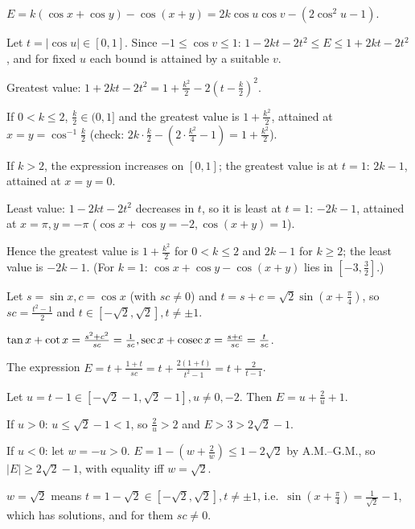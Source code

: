   $E = k(\cos x + \cos y) - \cos(x + y) = 2k\cos u\cos v - (2\cos^2u - 1)$.

  Let $t = |\cos u|\in[0, 1]$. Since $-1\le\cos v\le 1$: $1 - 2kt - 2t^2\le E\le 1 + 2kt - 2t^2$, and for fixed $u$
  each bound is attained by a suitable $v$.

  Greatest value: $1 + 2kt - 2t^2 = 1 + \frac{k^2}{2} - 2\left(t - \frac{k}{2}\right)^2$.

  If $0 < k\le 2$, $\frac{k}{2}\in(0, 1]$ and the greatest value is $1 + \frac{k^2}{2}$, attained at $x = y =
  \cos^{-1}\frac{k}{2}$ (check: $2k\cdot\frac{k}{2} - \left(2\cdot\frac{k^2}{4} - 1\right) = 1 + \frac{k^2}{2}$).

  If $k > 2$, the expression increases on $[0, 1]$; the greatest value is at $t = 1$: $2k - 1$, attained at $x = y =
  0$.

  Least value: $1 - 2kt - 2t^2$ decreases in $t$, so it is least at $t = 1$: $-2k - 1$, attained at $x = \pi, y =
  -\pi$ ($\cos x + \cos y = -2, \cos(x + y) = 1$).

  Hence the greatest value is $1 + \frac{k^2}{2}$ for $0 < k\le 2$ and $2k - 1$ for $k\ge 2$; the least value is $-2k
  - 1$. (For $k = 1$: $\cos x + \cos y - \cos(x + y)$ lies in $\left[-3, \frac{3}{2}\right]$.)
\item Let $s = \sin x, c = \cos x$ (with $sc\neq 0$) and $t = s + c = \sqrt{2}\sin\left(x + \frac{\pi}{4}\right)$,
  so $sc = \frac{t^2 - 1}{2}$ and $t\in\left[-\sqrt{2}, \sqrt{2}\right], t\neq\pm1$.

  $\tan x + \cot x = \frac{s^2 + c^2}{sc} = \frac{1}{sc}, \sec x + {\rm cosec}\, x = \frac{s + c}{sc} = \frac{t}{sc}$.

  The expression $E = t + \frac{1 + t}{sc} = t + \frac{2(1 + t)}{t^2 - 1} = t + \frac{2}{t - 1}$.

  Let $u = t - 1\in\left[-\sqrt{2} - 1, \sqrt{2} - 1\right], u\neq 0, -2$. Then $E = u + \frac{2}{u} + 1$.

  If $u > 0$: $u\le\sqrt{2} - 1 < 1$, so $\frac{2}{u} > 2$ and $E > 3 > 2\sqrt{2} - 1$.

  If $u < 0$: let $w = -u > 0$. $E = 1 - \left(w + \frac{2}{w}\right)\le 1 - 2\sqrt{2}$ by A.M.--G.M., so $|E|\ge
  2\sqrt{2} - 1$, with equality iff $w = \sqrt{2}$.

  $w = \sqrt{2}$ means $t = 1 - \sqrt{2}\in\left[-\sqrt{2}, \sqrt{2}\right], t\neq\pm1$, i.e.\ $\sin\left(x +
  \frac{\pi}{4}\right) = \frac{1}{\sqrt{2}} - 1$, which has solutions, and for them $sc\neq 0$.

